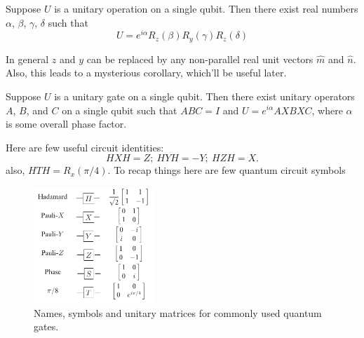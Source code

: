\begin{theorem}
    Suppose $U$ is a unitary operation on a single qubit. Then there exist real numbers $\alpha$, $\beta$, $\gamma$, $\delta$ such that
    \begin{equation}
        U = e^{i\alpha}R_z(\beta)R_y(\gamma)R_z(\delta)
    \end{equation}
\end{theorem}
In general $z$ and $y$ can be replaced by any non-parallel real unit vectors $\hat{m}$ and $\hat{n}$. Also, this leads to a mysterious corollary, which'll be useful later.
\begin{corollary}
    Suppose $U$ is a unitary gate on a single qubit. Then there exist unitary operators $A$, $B$, and $C$ on a single qubit such that $ABC=I$ and $U=e^{i\alpha}AXBXC$, where $\alpha$ is some overall phase factor.
\end{corollary}
Here are few useful circuit identities:
\begin{equation}
    HXH = Z;\ HYH = -Y;\ HZH = X.
\end{equation}
also, $HTH=R_x(\pi/4)$. To recap things here are few quantum circuit symbols
\begin{figure}[H]
    \centering
    \includegraphics[width=0.4\textwidth]{images/circuit_symbols.png}
    \caption{Names, symbols and unitary matrices for commonly used quantum gates.}
    \label{fig:circuit-symbols}
\end{figure}
